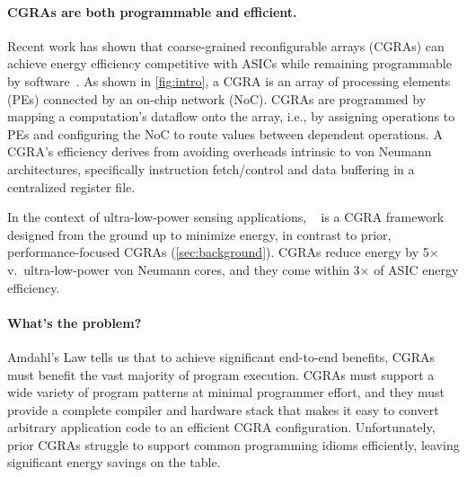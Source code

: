 \paragraph{CGRAs are both programmable and efficient.}
%
Recent work has shown that coarse-grained reconfigurable
arrays (CGRAs) can achieve energy efficiency competitive with ASICs
while remaining programmable by software~\cite{snafu,nowatzki2017domain,weng2020dsagen}.
%
As shown in \autoref{fig:intro},
a CGRA
 is an array of processing elements
(PEs) connected by an on-chip network (NoC).
%
CGRAs are programmed by mapping a computation's dataflow
onto the array, i.e., by assigning operations to PEs and configuring
the NoC to route values between dependent operations.
%
A CGRA's efficiency derives from avoiding overheads intrinsic to von
Neumann architectures, specifically instruction fetch/control and data
buffering in a centralized register file.

In the context of ultra-low-power sensing applications,
\snafu~\cite{snafu} is a CGRA framework designed from
the ground up to minimize energy, in contrast to prior,
performance-focused CGRAs (\autoref{sec:background}).
%
\snafu CGRAs reduce energy by 5$\times$ v.\ ultra-low-power von Neumann
cores, and they come within 3$\times$ of ASIC energy efficiency.

%

\paragraph{What's the problem?}
%
Amdahl's Law tells us that to achieve significant end-to-end benefits,
CGRAs must benefit the vast majority of program execution.
%
CGRAs must support a wide variety of program patterns at minimal programmer effort,
% 
and they must provide a complete compiler and hardware stack that makes it easy to convert arbitrary application code to an efficient CGRA configuration.
%
Unfortunately, prior CGRAs struggle to support common programming
idioms efficiently, leaving significant energy savings on the table.

